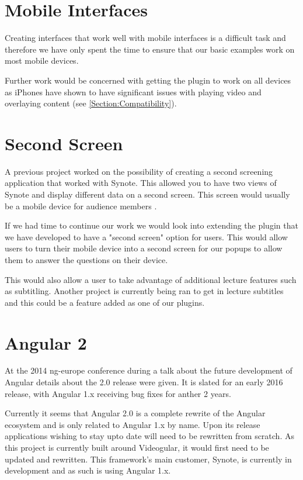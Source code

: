 \section{Mobile Interfaces}

Creating interfaces that work well with mobile interfaces is a difficult task and therefore we have only spent the time to ensure that our basic examples work on most mobile devices.

Further work would be concerned with getting the plugin to work on all devices as iPhones have shown to have significant issues with playing video and overlaying content (see \autoref{Section:Compatibility}).

\section{Second Screen}

A previous project  worked on the possibility of creating a second screening application that worked with Synote. This allowed you to have two views of Synote and display different data on a second screen. This screen would usually be a mobile device for audience members .

If we had time to continue our work we would look into extending the plugin that we have developed to have a "second screen" option for users. This would allow users to turn their mobile device into a second screen for our popups to allow them to answer the questions on their device.

This would also allow a user to take advantage of additional lecture features such as subtitling. Another project is currently being ran to get in lecture subtitles and this could be a feature added as one of our plugins.

\section{Angular 2}

At the 2014 ng-europe conference during a talk about the future development of Angular details about the 2.0 release were given. It is slated for an early 2016 release, with Angular 1.x receiving bug fixes for anther 2 years.

Currently it seems that Angular 2.0 is a complete rewrite of the Angular ecosystem and is only related to Angular 1.x by name. Upon its release applications wishing to stay upto date will need to be rewritten from scratch. As this project is currently built around Videogular, it would first need to be updated and rewritten. This framework's main customer, Synote, is currently in development and as such is using Angular 1.x. 

